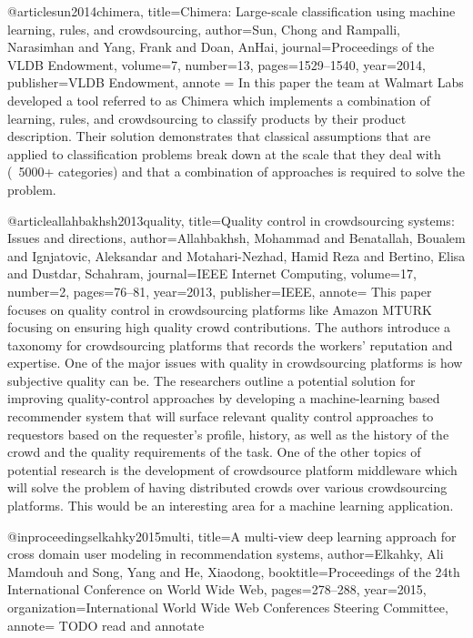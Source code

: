 @article{sun2014chimera,
  title={Chimera: Large-scale classification using machine learning, rules, and crowdsourcing},
  author={Sun, Chong and Rampalli, Narasimhan and Yang, Frank and Doan, AnHai},
  journal={Proceedings of the VLDB Endowment},
  volume={7},
  number={13},
  pages={1529--1540},
  year={2014},
  publisher={VLDB Endowment},
  annote = {
    In this paper the team at Walmart Labs developed a tool referred to as Chimera which implements a combination of learning, rules, and crowdsourcing to classify products by their
    product description. Their solution demonstrates that classical assumptions that are applied to classification problems break down at the scale that they deal with (~5000+ categories)
    and that a combination of approaches is required to solve the problem.
  }
}

@article{allahbakhsh2013quality,
  title={Quality control in crowdsourcing systems: Issues and directions},
  author={Allahbakhsh, Mohammad and Benatallah, Boualem and Ignjatovic, Aleksandar and Motahari-Nezhad, Hamid Reza and Bertino, Elisa and Dustdar, Schahram},
  journal={IEEE Internet Computing},
  volume={17},
  number={2},
  pages={76--81},
  year={2013},
  publisher={IEEE},
  annote={
  This paper focuses on quality control in crowdsourcing platforms like Amazon MTURK focusing on ensuring high quality crowd contributions. The authors introduce a taxonomy for crowdsourcing platforms
  that records the workers' reputation and expertise. One of the major issues with quality in crowdsourcing platforms is how subjective quality can be. The researchers outline a potential solution for improving
  quality-control approaches by developing a machine-learning based recommender system that will surface relevant quality control approaches to requestors based on the requester's profile, history, as well as the history
  of the crowd and the quality requirements of the task. One of the other topics of potential research is the development of crowdsource platform middleware which will solve the problem of having distributed crowds over various
  crowdsourcing platforms. This would be an interesting area for a machine learning application.
  }
}

@inproceedings{elkahky2015multi,
  title={A multi-view deep learning approach for cross domain user modeling in recommendation systems},
  author={Elkahky, Ali Mamdouh and Song, Yang and He, Xiaodong},
  booktitle={Proceedings of the 24th International Conference on World Wide Web},
  pages={278--288},
  year={2015},
  organization={International World Wide Web Conferences Steering Committee},
  annote={
  TODO read and annotate
  }
}

